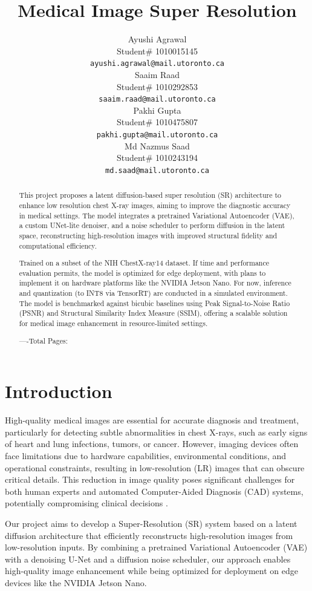 \documentclass{article} %
\title{Medical Image Super Resolution}
\author{Ayushi Agrawal  \\
Student\# 1010015145\\
\texttt{ayushi.agrawal@mail.utoronto.ca} \\
\And
Saaim Raad  \\
Student\# 1010292853 \\
\texttt{saaim.raad@mail.utoronto.ca} \\
\And
Pakhi Gupta  \\
Student\# 1010475807 \\
\texttt{pakhi.gupta@mail.utoronto.ca} \\
\And
Md Nazmus Saad\\
Student\# 1010243194 \\
\texttt{md.saad@mail.utoronto.ca} \\
}
\begin{document}
\maketitle

\begin{abstract}
This project proposes a latent diffusion-based super resolution (SR) architecture to enhance low resolution chest X-ray images, aiming to improve the diagnostic accuracy in medical settings. The model integrates a pretrained Variational Autoencoder (VAE), a custom UNet-lite denoiser, and a noise scheduler to perform diffusion in the latent space, reconstructing high-resolution images with improved structural fidelity and computational efficiency.

Trained on a subset of the NIH ChestX-ray14 dataset. If time and performance evaluation permits, the model is optimized for edge deployment, with plans to implement it on hardware platforms like the NVIDIA Jetson Nano. For now, inference and quantization (to INT8 via TensorRT) are conducted in a simulated environment. The model is benchmarked against bicubic baselines using Peak Signal-to-Noise Ratio (PSNR) and Structural Similarity Index Measure (SSIM), offering a scalable solution for medical image enhancement in resource-limited settings.

----Total Pages: \pageref{last_page}
\end{abstract}



\section{Introduction}

High-quality medical images are essential for accurate diagnosis and treatment, particularly for detecting subtle abnormalities in chest X-rays, such as early signs of heart and lung infections, tumors, or cancer. However, imaging devices often face limitations due to hardware capabilities, environmental conditions, and operational constraints, resulting in low-resolution (LR) images that can obscure critical details. This reduction in image quality poses significant challenges for both human experts and automated Computer-Aided Diagnosis (CAD) systems, potentially compromising clinical decisions \citep{Sabina23}. 

Our project aims to develop a Super-Resolution (SR) system based on a latent diffusion architecture that efficiently reconstructs high-resolution images from low-resolution inputs. By combining a pretrained Variational Autoencoder (VAE) with a denoising U-Net and a diffusion noise scheduler, our approach enables high-quality image enhancement while being optimized for deployment on edge devices like the NVIDIA Jetson Nano.
\end{document}
